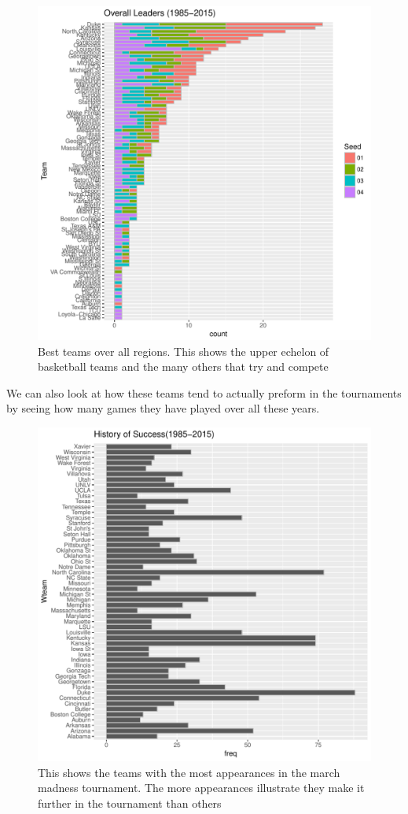 \documentclass[]{scrartcl}
\begin{document}
\begin{figure}[H]
	\centering
	\includegraphics[scale=.75]{455Project/overLeaders.pdf}
	\caption[overallLeaders]{Best teams over all regions. This shows the upper echelon of basketball teams and the many others that try and compete}
	\label{rVals}
\end{figure}
We can also look at how these teams tend to actually preform in the tournaments by seeing how many games they have played over all these years.
\begin{figure}[H]
	\centering
	\includegraphics[scale=.75]{455Project/HistOfSuccess2.pdf}
	\caption[HistOfSuccess]{This shows the teams with the most appearances in the march madness tournament. The more appearances illustrate they make it further in the tournament than others}
	\label{rVals}
\end{figure}
\end{document}
